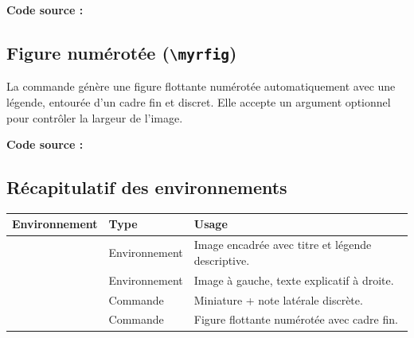 
\textbf{Code source :}
\begin{texblock}
\end{texblock}

\subsection{Figure numérotée (\texttt{\textbackslash myrfig})}

La commande  génère une figure flottante numérotée automatiquement avec une légende, entourée d'un cadre fin et discret. Elle accepte un argument optionnel pour contrôler la largeur de l'image.


\textbf{Code source :}
\begin{texblock}

\end{texblock}

\subsection{Récapitulatif des environnements}

\vspace{10pt}
\begin{tabularx}{\textwidth}{L{3.5cm} L{3.5cm} X}
    \toprule
    \textbf{Environnement} & \textbf{Type} & \textbf{Usage} \\
    \midrule
     & Environnement & Image encadrée avec titre et légende descriptive. \\
     & Environnement & Image à gauche, texte explicatif à droite. \\
     & Commande & Miniature + note latérale discrète. \\
     & Commande & Figure flottante numérotée avec cadre fin. \\
    \bottomrule
\end{tabularx}


